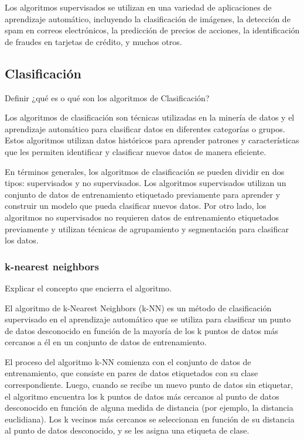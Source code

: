 \documentclass[12pt]{article}
\begin{document}
Los algoritmos supervisados se utilizan en una variedad de aplicaciones de aprendizaje automático, 
incluyendo la clasificación de imágenes, la detección de spam en correos electrónicos, la predicción de precios 
de acciones, la identificación de fraudes en tarjetas de crédito, y muchos otros.

\subsection*{Clasificación}

Definir ¿qué es o qué son los algoritmos de Clasificación?

Los algoritmos de clasificación son técnicas utilizadas en la minería de datos y el aprendizaje automático
para clasificar datos en diferentes categorías o grupos. Estos algoritmos utilizan datos históricos para aprender
patrones y características que les permiten identificar y clasificar nuevos datos de manera eficiente.

En términos generales, los algoritmos de clasificación se pueden dividir en dos tipos: supervisados y no supervisados.
Los algoritmos supervisados utilizan un conjunto de datos de entrenamiento etiquetado previamente para aprender y construir
un modelo que pueda clasificar nuevos datos. Por otro lado, los algoritmos no supervisados no requieren datos de entrenamiento 
etiquetados previamente y utilizan técnicas de agrupamiento y segmentación para clasificar los datos.

\subsubsection*{k-nearest neighbors}

Explicar el concepto que encierra el algoritmo.

El algoritmo de k-Nearest Neighbors (k-NN) es un método de clasificación supervisado en el aprendizaje automático
que se utiliza para clasificar un punto de datos desconocido en función de la mayoría de los k puntos de datos más
cercanos a él en un conjunto de datos de entrenamiento.

El proceso del algoritmo k-NN comienza con el conjunto de datos de entrenamiento, que consiste en pares de datos
etiquetados con su clase correspondiente. Luego, cuando se recibe un nuevo punto de datos sin etiquetar, el algoritmo
encuentra los k puntos de datos más cercanos al punto de datos desconocido en función de alguna medida de distancia
(por ejemplo, la distancia euclidiana). Los k vecinos más cercanos se seleccionan en función de su distancia al punto
de datos desconocido, y se les asigna una etiqueta de clase.
\end{document}
